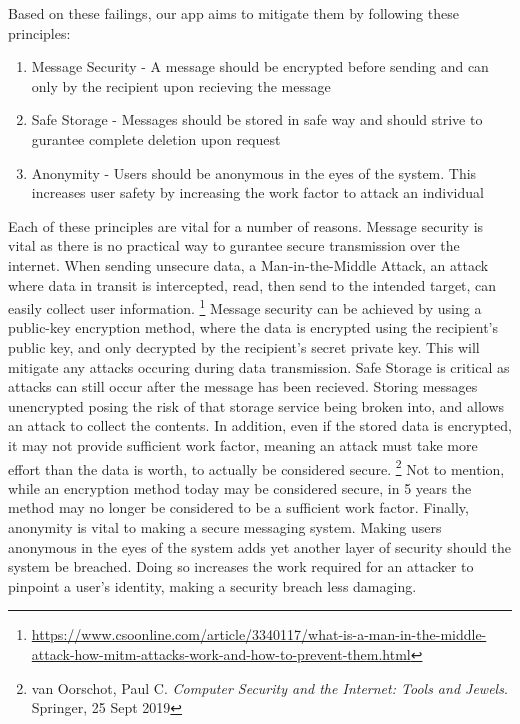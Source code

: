 \documentclass[titlepage]{article}
\begin{document}
    Based on these failings, our app aims to mitigate them by following these principles:
    \begin{enumerate}
        \item Message Security - A message should be encrypted before sending and can only by the recipient upon recieving the message
        \item Safe Storage - Messages should be stored in safe way and should strive to gurantee complete deletion upon request
        \item Anonymity - Users should be anonymous in the eyes of the system. This increases user safety by increasing the work factor to attack an individual
    \end{enumerate}
    Each of these principles are vital for a number of reasons.
    Message security is vital as there is no practical way to gurantee secure transmission over the internet.
    When sending unsecure data, a Man-in-the-Middle Attack, an attack where data in transit is intercepted, read, then send to the intended target, can easily collect user information.
    \footnote{\url{https://www.csoonline.com/article/3340117/what-is-a-man-in-the-middle-attack-how-mitm-attacks-work-and-how-to-prevent-them.html}}
    Message security can be achieved by using a public-key encryption method, where the data is encrypted using the recipient's public key, and only decrypted by the recipient's secret private key.
    This will mitigate any attacks occuring during data transmission.
    Safe Storage is critical as attacks can still occur after the message has been recieved.
    Storing messages unencrypted posing the risk of that storage service being broken into, and allows an attack to collect the contents.
    In addition, even if the stored data is encrypted, it may not provide sufficient work factor, meaning an attack must take more effort than the data is worth, to actually be considered secure.
    \footnote{van Oorschot, Paul C. \textit{Computer Security and the Internet: Tools and Jewels}. Springer, 25 Sept 2019}
    Not to mention, while an encryption method today may be considered secure, in 5 years the method may no longer be considered to be a sufficient work factor.
    Finally, anonymity is vital to making a secure messaging system.
    Making users anonymous in the eyes of the system adds yet another layer of security should the system be breached.
    Doing so increases the work required for an attacker to pinpoint a user's identity, making a security breach less damaging.

\end{document}
